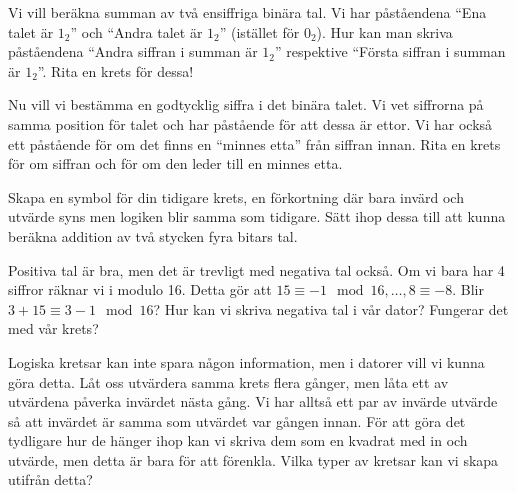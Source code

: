 \begin{problem}
	Vi vill beräkna summan av två ensiffriga binära tal. Vi har påståendena ``Ena talet är \(1_2\)'' och ``Andra talet är \(1_2\)'' (istället för \(0_2\)). Hur kan man skriva påståendena ``Andra siffran i summan är \(1_2\)'' respektive ``Första siffran i summan är \(1_2\)''. Rita en krets för dessa!
\end{problem}

\begin{problem}
	Nu vill vi bestämma en godtycklig siffra i det binära talet. Vi vet siffrorna på samma position för talet och har påstående för att dessa är ettor. Vi har också ett påstående för om det finns en ``minnes etta'' från siffran innan. Rita en krets för om siffran och för om den leder till en minnes etta.
\end{problem}

\begin{problem}
	Skapa en symbol för din tidigare krets, en förkortning där bara invärd och utvärde syns men logiken blir samma som tidigare. Sätt ihop dessa till att kunna beräkna addition av två stycken fyra bitars tal.
\end{problem}

\begin{problem}[Extra]
	Positiva tal är bra, men det är trevligt med negativa tal också. Om vi bara har 4 siffror räknar vi i modulo 16. Detta gör att \(15 \equiv -1 \mod 16, \dots , 8 \equiv -8\). Blir \(3 + 15 \equiv 3 - 1 \mod 16\)? Hur kan vi skriva negativa tal i vår dator? Fungerar det med vår krets?
\end{problem}

\begin{problem}[Extra]
	Logiska kretsar kan inte spara någon information, men i datorer vill vi kunna göra detta. Låt oss utvärdera samma krets flera gånger, men låta ett av utvärdena påverka invärdet nästa gång. Vi har alltså ett par av invärde utvärde så att invärdet är samma som utvärdet var gången innan. För att göra det tydligare hur de hänger ihop kan vi skriva dem som en kvadrat med in och utvärde, men detta är bara för att förenkla. Vilka typer av kretsar kan vi skapa utifrån detta?
\end{problem}


% 
